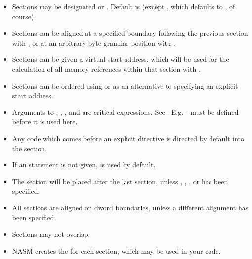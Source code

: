 \begin{itemize}
    \item{Sections may be designated  or .
        Default is  (except , which defaults to
        , of course).}

    \item{Sections can be aligned at a specified boundary following the previous
        section with , or at an arbitrary byte-granular position with
        .}

    \item{Sections can be given a virtual start address, which will be used
        for the calculation of all memory references within that section
        with .}

    \item{Sections can be ordered using  or
         as an alternative to specifying
        an explicit start address.}

    \item{Arguments to , , , and 
        are critical expressions. See . E.g.
         -  must be defined
        before it is used here.}

    \item{Any code which comes before an explicit  directive
        is directed by default into the  section.}

    \item{If an  statement is not given,  is used by default.}

    \item{The  section will be placed after the last 
        section, unless , , , or
         has been specified.}

    \item{All sections are aligned on dword boundaries, unless a different
        alignment has been specified.}

    \item{Sections may not overlap.}

    \item{NASM creates the  for each section,
        which may be used in your code.}
\end{itemize}

